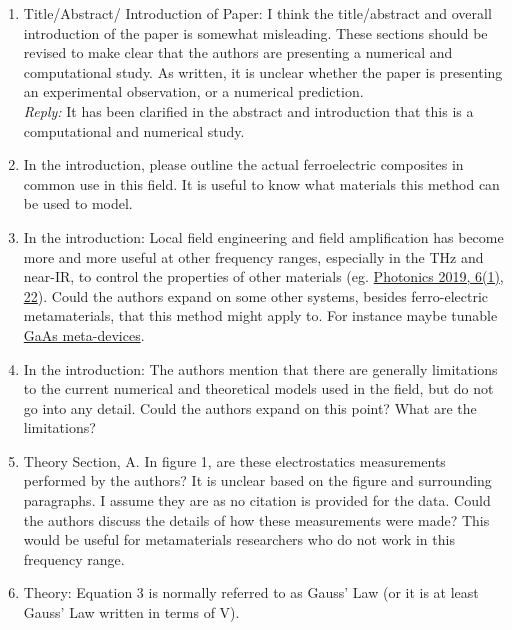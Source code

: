 \documentclass[%
 aip,
 amsmath,amssymb,
 reprint,%
]{revtex4-1}
\newcommand{\rep}[1]{\textcolor{reply}{\textit{Reply:} #1}}
\begin{document}
\begin{enumerate}
\item Title/Abstract/ Introduction of Paper: I think the title/abstract and overall introduction of the
 paper is somewhat misleading. These sections should be revised to make clear that the authors are
  presenting a numerical and computational study. As written, it is unclear whether the paper is presenting
   an experimental observation, or a numerical prediction.\\


\rep{It has been clarified in the abstract and introduction that this is a computational and numerical study.}



\item In the introduction, please outline the actual ferroelectric composites in common use in this field.
 It is useful to know what materials this method can be used to model.

\item In the introduction: Local field engineering and field amplification has become more and more useful
 at other frequency ranges, especially in the THz and near-IR, to control the properties of other materials
  (eg. \href{https://doi.org/10.3390/photonics6010022}{Photonics 2019, 6(1), 22}). Could the authors expand
   on some other systems, besides ferro-electric metamaterials, that this method might apply to. For
    instance maybe tunable
    \href{https://journals.aps.org/prl/abstract/10.1103/PhysRevLett.110.217404}{GaAs meta-devices}.


\item In the introduction: The authors mention that there are generally limitations to the current
 numerical and theoretical models used in the field, but do not go into any detail. Could the authors
  expand on this point? What are the limitations?

\item Theory Section, A. In figure 1, are these electrostatics measurements performed by the authors? It is
 unclear based on the figure and surrounding paragraphs. I assume they are as no citation is provided for
  the data. Could the authors discuss the details of how these measurements were made? This would be useful
   for metamaterials researchers who do not work in this frequency range.


\item Theory: Equation 3 is normally referred to as Gauss' Law (or it is at least Gauss' Law written in
 terms of V).


\end{enumerate}
\end{document}
